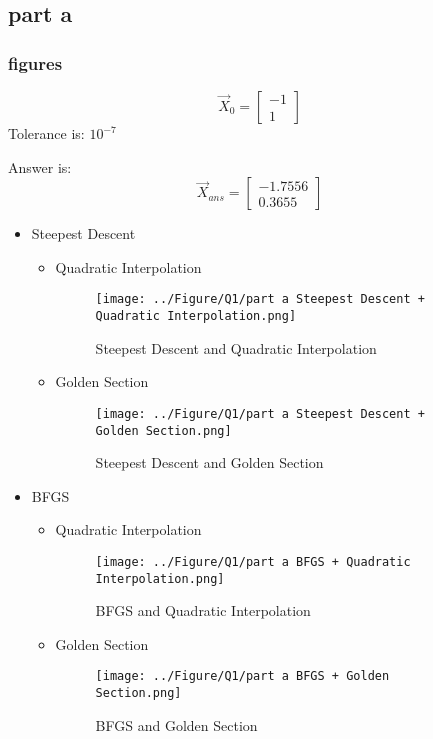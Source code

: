 \subsection{part a}
\subsubsection{figures}
$$\vec X_0 = \begin{bmatrix}
	-1\\1
\end{bmatrix}$$
Tolerance is: $10^{-7}$


Answer is:
 $$\vec X_{ans} = \begin{bmatrix}
 	-1.7556\\
 	0.3655
 \end{bmatrix}$$
\newpage
\begin{itemize}
	\item Steepest Descent
	\begin{itemize}
		\item Quadratic Interpolation
		\begin{figure}[H]
			\caption{Steepest Descent and Quadratic Interpolation}
			\centering
			\texttt{[image: ../Figure/Q1/part a Steepest Descent + Quadratic Interpolation.png]}
		\end{figure}
		\item Golden Section
		\begin{figure}[H]
			\caption{Steepest Descent and Golden Section}
			\centering
			\texttt{[image: ../Figure/Q1/part a Steepest Descent + Golden Section.png]}
		\end{figure}
	\end{itemize}
	\item BFGS
	\begin{itemize}
		\item Quadratic Interpolation
		\begin{figure}[H]
			\caption{BFGS and Quadratic Interpolation}
			\centering
			\texttt{[image: ../Figure/Q1/part a BFGS + Quadratic Interpolation.png]}
		\end{figure}
		\item Golden Section
			\begin{figure}[H]
				\caption{BFGS and Golden Section}
				\centering
				\texttt{[image: ../Figure/Q1/part a BFGS + Golden Section.png]}
		\end{figure}
	\end{itemize}
\end{itemize}
